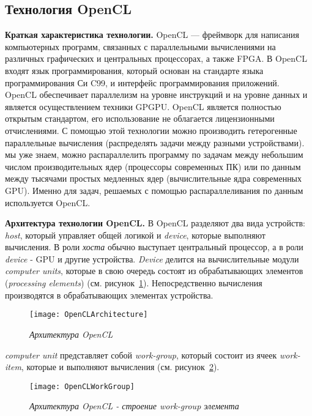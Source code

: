 { %
	\subsection{Технология OpenCL}
	\label{OpenCL:section}
	\par\textbf{Краткая характеристика технологии.} OpenCL — фреймворк для написания компьютерных программ, связанных с параллельными вычислениями на различных графических и центральных процессорах, а также FPGA. В OpenCL входят язык программирования, который основан на стандарте языка программирования Си C99, и интерфейс программирования приложений. OpenCL обеспечивает параллелизм на уровне инструкций и на уровне данных и является осуществлением техники GPGPU. OpenCL является полностью открытым стандартом, его использование не облагается лицензионными отчислениями. С помощью этой технологии можно производить гетерогенные параллельные вычисления (распределять задачи между разными устройствами).
	 мы уже знаем, можно распараллелить программу по задачам между небольшим числом производительных ядер (процессоры современных ПК) или по данным между тысячами простых медленных ядер (вычислительные ядра современных GPU). Именно для задач, решаемых с помощью распараллеливания по данным используется OpenCL.
	\par\textbf{Архитектура технологии OpenCL.} В OpenCL разделяют два вида устройств: \textit{host}, который управляет общей логикой и \textit{device}, которые выполняют вычисления. В роли \textit{хоста} обычно выступает центральный процессор, а в роли \textit{device} - GPU и другие устройства. \textit{Device} делится на вычислительные модули \textit{computer units}, которые в свою очередь состоят из обрабатывающих элементов (\textit{processing elements}) (см. рисунок~\ref{OpenCLArchitecture:image}). Непосредственно вычисления  производятся  в  обрабатывающих  элементах устройства.
	\begin{figure}[H]
		\texttt{[image: OpenCLArchitecture]}
		\caption{\textit{Архитектура OpenCL}}
		\label{OpenCLArchitecture:image}
	\end{figure}
	 \textit{computer unit} представляет собой \textit{work-group}, который состоит из ячеек \textit{work-item}, которые и выполняют вычисления (см. рисунок~\ref{OpenCLWorkGroup:image}).
	\begin{figure}[H]
		\texttt{[image: OpenCLWorkGroup]}
		\caption{\textit{Архитектура OpenCL - строение work-group элемента}}
		\label{OpenCLWorkGroup:image}
	\end{figure}
}
